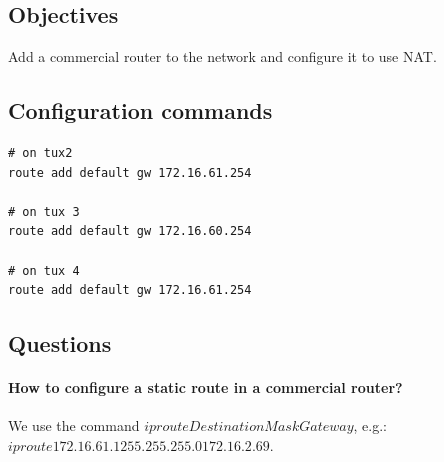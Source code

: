 \documentclass[11pt]{report}
\begin{document}
\subsection{Objectives}
Add a commercial router to the network and configure it to use NAT.

\subsection{Configuration commands}
\begin{lstlisting}
# on tux2
route add default gw 172.16.61.254

# on tux 3
route add default gw 172.16.60.254

# on tux 4
route add default gw 172.16.61.254
\end{lstlisting}

\subsection{Questions}
\paragraph{How to configure a static route in a commercial router?}
We use the command $ip route Destination Mask Gateway$, e.g.:
$ip route 172.16.61.1 255.255.255.0 172.16.2.69$.
\end{document}
